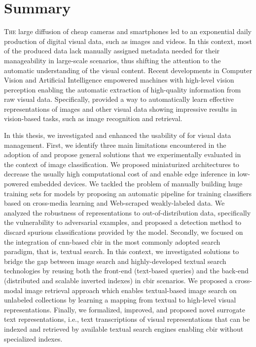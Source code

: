 \chapter*{Summary}
\lettrine{T}{he} large diffusion of cheap cameras and smartphones led to an exponential daily production of digital visual data, such as images and videos.
In this context, most of the produced data lack manually assigned metadata needed for their manageability in large-scale scenarios, thus shifting the attention to the automatic understanding of the visual content.
Recent developments in Computer Vision and Artificial Intelligence empowered machines with high-level vision perception enabling the automatic extraction of high-quality information from raw visual data.
Specifically,  provided a way to automatically learn effective representations of images and other visual data showing impressive results in vision-based tasks, such as image recognition and retrieval.

In this thesis, we investigated and enhanced the usability of  for visual data management.
First, we identify three main limitations encountered in the adoption of  and propose general solutions that we experimentally evaluated in the context of image classification.
We proposed miniaturized architectures to decrease the usually high computational cost of  and enable edge inference in low-powered embedded devices.
We tackled the problem of manually building huge training sets for models by proposing an automatic pipeline for training classifiers based on cross-media learning and Web-scraped weakly-labeled data.
We analyzed the robustness of  representations to out-of-distribution data, specifically the vulnerability to adversarial examples, and proposed a detection method to discard spurious classifications provided by the model.
%
Secondly, we focused on the integration of \acrshort{cnn}-based \acrshort{cbir} in the most commonly adopted search paradigm, that is, textual search.
In this context, we investigated solutions to bridge the gap between image search and highly-developed textual search technologies by reusing both the front-end (text-based queries) and the back-end (distributed and scalable inverted indexes) in \acrshort{cbir} scenarios.
We proposed a cross-modal image retrieval approach which enables textual-based image search on unlabeled collections by learning a mapping from textual to high-level visual representations.
Finally, we formalized, improved, and proposed novel surrogate text representations, i.e., text transcriptions of visual representations that can be indexed and retrieved by available textual search engines enabling \acrshort{cbir} without specialized indexes.
